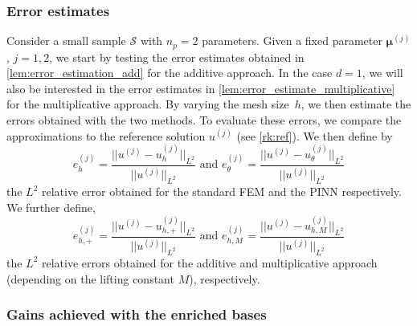 \subsubsection{Error estimates}\label{sec:setup_error_estimates}

Consider a small sample $\mathcal{S}$ with $n_p=2$ parameters. Given a fixed parameter $\bm{\mu}^{(j)}$, $j=1,2$, we start by testing the error estimates obtained in \cref{lem:error_estimation_add} for the additive approach. In the case $d=1$, we will also be interested in the error estimates in \cref{lem:error_estimate_multiplicative} for the multiplicative approach. By varying the mesh size~$h$, we then estimate the errors obtained with the two methods.
To evaluate these errors, we compare the approximations to the reference solution $u^{(j)}$ (see \cref{rk:ref}).
We then define by
\begin{equation}\label{eq:error_rel_FEM}
	e_h^{(j)}=\frac{||u^{(j)}-u_h^{(j)}||_{L^2}}{||u^{(j)}||_{L^2}}
	\text{ and }
	e_\theta^{(j)}=\frac{||u^{(j)}-u_\theta^{(j)}||_{L^2}}{||u^{(j)}||_{L^2}}
\end{equation}
the $L^2$ relative error obtained for the standard FEM and the PINN respectively. We further define,
\begin{equation}
    \label{eq:error_rel_add}
	e_{h,+}^{(j)}=\frac{||u^{(j)}-u_{h,+}^{(j)}||_{L^2}}{||u^{(j)}||_{L^2}}
	\text{ and }
	e_{h,M}^{(j)}=\frac{||u^{(j)}-u_{h,M}^{(j)}||_{L^2}}{||u^{(j)}||_{L^2}}
\end{equation}
the $L^2$ relative errors obtained for the additive and multiplicative approach (depending on the lifting constant $M$), respectively.


\subsubsection{Gains achieved with the enriched bases}\label{sec:setup_gains}

